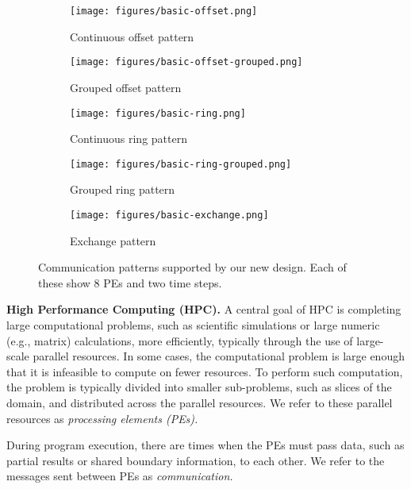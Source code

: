 \begin{figure*}
    \centering
    \begin{subfigure}{0.18\textwidth}
         \centering
         \texttt{[image: figures/basic-offset.png]}
         \caption{Continuous offset pattern}
         \label{fig:oc}
    \end{subfigure}
    \begin{subfigure}{0.18\textwidth}
         \centering
         \texttt{[image: figures/basic-offset-grouped.png]}
         \caption{Grouped offset pattern}
         \label{fig:og}
    \end{subfigure}
    \begin{subfigure}{0.18\textwidth}
         \centering
         \texttt{[image: figures/basic-ring.png]}
         \caption{Continuous ring pattern}
         \label{fig:rc}
    \end{subfigure}
    \begin{subfigure}{0.18\textwidth}
         \centering
         \texttt{[image: figures/basic-ring-grouped.png]}
         \caption{Grouped ring pattern}
         \label{fig:rg}
    \end{subfigure}
    \begin{subfigure}{0.18\textwidth}
         \centering
         \texttt{[image: figures/basic-exchange.png]}
         \caption{Exchange pattern}
         \label{fig:eg}
    \end{subfigure}
    \caption{Communication patterns supported by our new design. Each of these show 8 PEs and two time steps.}
    \label{fig:commpatterns}
\end{figure*}

\vspace{1ex}

\textbf{High Performance Computing (HPC).} A central goal of HPC is completing large computational problems, such as scientific simulations or large numeric (e.g., matrix) calculations, more efficiently, typically through the use of large-scale parallel resources. In some cases, the computational problem is large enough that it is infeasible to compute on fewer resources. To perform such computation, the problem is typically divided into smaller sub-problems, such as slices of the domain, and distributed across the parallel resources. We refer to these parallel resources as {\em processing elements (PEs).}

During program execution, there are times when the PEs must pass data, such as partial results or shared boundary information, to each other. We refer to the messages sent between PEs as {\em communication.}


